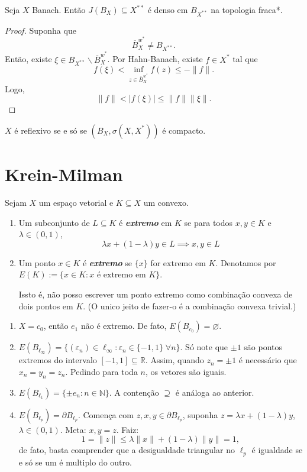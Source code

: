 \documentclass[portuguese]{article}
\theoremstyle{definition}
\newcommand{\R}{\mathbb{R}}
\newcommand{\N}{\mathbb{N}}
\begin{document}
	\begin{teo}[Goldstine]
		Seja $X$ Banach. Então $J(B_X)\subseteq X^{**}$ é denso em $B_{X^{**}}$ na topologia fraca*.
	\end{teo}
	\begin{proof}
		Suponha que
		\[\overline{B}_X^{w^*}\neq B_{X^{**}}.\]
		Então, existe $\xi\in B_{X^{**}}\backslash \overline{B}_X^{w^*}$. Por Hahn-Banach, existe $f\in X^*$ tal que
		\[f(\xi)<\inf_{z\in \overline{B}_X^{w^*}}f(z)\leq-\| f\|.\]
		Logo,
		\[\| f\|<|f(\xi)|\leq\| f\|\|\xi\|.\]
	\end{proof}
	\begin{coro}
		$X$ é reflexivo se e só se $(B_X,\sigma(X,X^*))$ é compacto.
	\end{coro}
	
	\section{Krein-Milman}
	\begin{defn}
		Sejam $X$ um espaço vetorial e $K\subseteq X$ um convexo.
		\begin{enumerate}
			\item Um subconjunto de $L\subseteq K$ é \textbf{\textit{extremo}} em $K$ se para todos $x,y\in K$ e $\lambda\in(0,1)$,
			\[\lambda x+(1-\lambda)y\in L\implies x,y\in L\]
			\item Um ponto $x\in K$ é \textbf{\textit{extremo}} se $\{x\}$ for extremo em $K$. Denotamos por $E(K):=\{x\in K:x\text{ é extremo em }K\}$.
			
			Issto é, não posso escrever um ponto extremo como combinação convexa de dois pontos em $K$. (O unico jeito de fazer-o é a combinação convexa trivial.)
		\end{enumerate}
	\end{defn}
	\begin{exemplos}\leavevmode
		\begin{enumerate}
			\item $X=c_0$, então $e_1$ não é extremo. De fato, $E(B_{c_0})=\varnothing$.
			\item $E(B_{\ell_\infty})=\{(\varepsilon_n)\in\ell_\infty:\varepsilon_n\in\{-1,1\}\;\forall n\}$. Só note que  $\pm1$ são pontos extremos do intervalo $[-1,1]\subseteq\R$. Assim, quando $z_n=\pm1$ é necessário que $x_n=y_n=z_n$. Pedindo para toda $n$, os vetores são iguais.
			\item $E(B_{\ell_1})=\{\pm e_n:n\in\N\}$. A contenção $\supseteq$ é análoga ao anterior.
			\item {\color{persiangreen}$E(B_{\ell_p})=\partial B_{\ell_p}$.  Comença com $z,x,y\in\partial B_{\ell_p}$, suponha $z=\lambda x+(1-\lambda)y$, $\lambda\in(0,1)$. Meta: $x,y=z$. Faiz:
				\[1=\| z\|\leq\lambda\| x\| +(1-\lambda)\| y\|=1,\]
				de fato, basta comprender que a desigualdade triangular no $\ell_p$ é igualdade se e só se um é multiplo do outro.}
		\end{enumerate}
	\end{exemplos}
	
\end{document}
